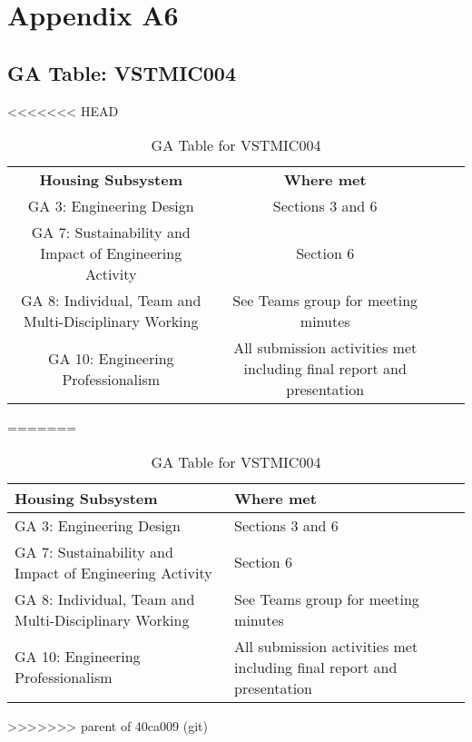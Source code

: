 \documentclass[class=report,11pt,crop=false]{standalone}
\begin{document}
	\chapter{Appendix A6}
	\section{GA Table: VSTMIC004}
	\begin{table}[h!]
		\centering
		\caption{GA Table for VSTMIC004}
<<<<<<< HEAD
		\begin{tabular}{cccc}
			\textbf{Housing Subsystem}                              & \textbf{Where met}                                                    \\
			GA 3: Engineering Design                                & Sections 3 and 6                                                      \\
			GA 7: Sustainability and Impact of Engineering Activity & Section 6                                                             \\
			GA 8: Individual, Team and Multi-Disciplinary Working   & See Teams group for meeting minutes                                   \\
			GA 10: Engineering Professionalism                      & All submission activities met including final report and presentation 
		\end{tabular}
=======
		\begin{tabularx}{0.8\textwidth}
			{ 
				| >{\centering\arraybackslash}X 
				| >{\centering\arraybackslash}X |}
			\hline
			\textbf{Housing Subsystem} & \textbf{Where met}                                                    \\ \hline
			GA 3: Engineering Design                                                                                               & Sections 3 and 6                                                      \\ \hline
			GA 7: Sustainability and Impact of Engineering Activity                                                                & Section 6                                                             \\ \hline
			GA 8: Individual, Team and Multi-Disciplinary Working                                                                  & See Teams group for meeting minutes                                   \\ \hline
			GA 10: Engineering Professionalism                                                                                     & All submission activities met including final report and presentation \\ \hline
		\end{tabularx}
		\label{tab:A6}
>>>>>>> parent of 40ca009 (git)
		
	\end{table}
	\ifstandalone
	
	\printnoidxglossary[type=\acronymtype,nonumberlist]
	\fi
\end{document}
